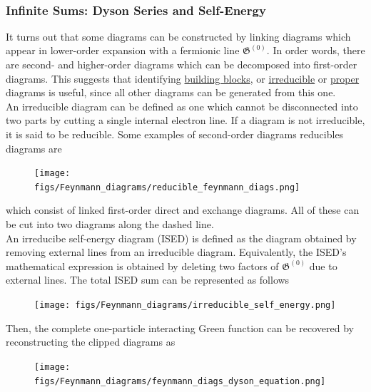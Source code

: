 \documentclass{homework}
\begin{document}
\blanky \\

\subsubsection{Infinite Sums: Dyson Series and Self-Energy}

It turns out that some diagrams can be constructed by linking diagrams which appear in lower-order expansion with a fermionic line $\mathfrak{G}^{(0)}$. In order words, there are second- and higher-order diagrams which can be decomposed into first-order diagrams. This suggests that identifying \underline{building blocks}, or \underline{irreducible} or \underline{proper} diagrams is useful, since all other diagrams can be generated from this one. \\

An irreducible diagram can be defined as one which cannot be disconnected into two parts by cutting a single internal electron line. If a diagram is not irreducible, it is said to be reducible. Some examples of second-order diagrams reducibles diagrams are 

\begin{figure}[H]
    \centering
    \texttt{[image: figs/Feynmann\_diagrams/reducible\_feynmann\_diags.png]}
\end{figure}

which consist of linked first-order direct and exchange diagrams. All of these can be cut into two diagrams along the dashed line. \\

An irreducibe self-energy diagram (ISED) is defined as the diagram obtained by removing external lines from an irreducible diagram. Equivalently, the ISED's mathematical expression is obtained by deleting two factors of $\mathfrak{G}^{(0)}$ due to external lines. The total ISED sum can be represented as follows 

\begin{figure}[H]
    \centering
    \texttt{[image: figs/Feynmann\_diagrams/irreducible\_self\_energy.png]}
    \label{Feynmann_diags_ISED_sum}
\end{figure}

Then, the complete one-particle interacting Green function can be recovered by reconstructing the clipped diagrams as 

\begin{figure}[H]
    \centering
    \texttt{[image: figs/Feynmann\_diagrams/feynmann\_diags\_dyson\_equation.png]}
\end{figure}
\end{document}
